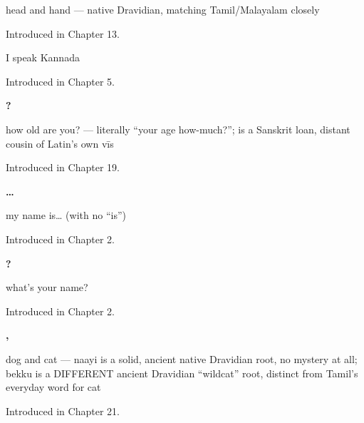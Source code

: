 \noindent\begin{minipage}[t]{\linewidth}
\raggedright
\textbf{ }\par
\small head and hand — native Dravidian, matching Tamil/Malayalam closely\par
\footnotesize Introduced in Chapter 13.
\end{minipage}\par\medskip

\noindent\begin{minipage}[t]{\linewidth}
\raggedright
\textbf{  }\par
\small I speak Kannada\par
\footnotesize Introduced in Chapter 5.
\end{minipage}\par\medskip

\noindent\begin{minipage}[t]{\linewidth}
\raggedright
\textbf{  ?}\par
\small how old are you? — literally \textquotedblleft{}your age how-much?\textquotedblright{};  is a Sanskrit loan, distant cousin of Latin's own vīs\par
\footnotesize Introduced in Chapter 19.
\end{minipage}\par\medskip

\noindent\begin{minipage}[t]{\linewidth}
\raggedright
\textbf{  …}\par
\small my name is… (with no \textquotedblleft{}is\textquotedblright{})\par
\footnotesize Introduced in Chapter 2.
\end{minipage}\par\medskip

\noindent\begin{minipage}[t]{\linewidth}
\raggedright
\textbf{  ?}\par
\small what's your name?\par
\footnotesize Introduced in Chapter 2.
\end{minipage}\par\medskip

\noindent\begin{minipage}[t]{\linewidth}
\raggedright
\textbf{, }\par
\small dog and cat — naayi is a solid, ancient native Dravidian root, no mystery at all; bekku is a DIFFERENT ancient Dravidian \textquotedblleft{}wildcat\textquotedblright{} root, distinct from Tamil's everyday word for cat\par
\footnotesize Introduced in Chapter 21.
\end{minipage}\par\medskip

